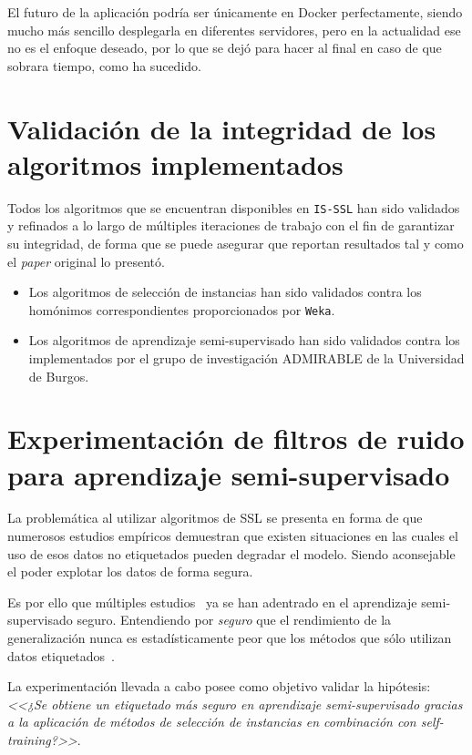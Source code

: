 El futuro de la aplicación podría ser únicamente en Docker perfectamente, siendo mucho más sencillo desplegarla en diferentes servidores, pero en la actualidad ese no es el enfoque deseado, por lo que se dejó para hacer al final en caso de que sobrara tiempo, como ha sucedido.

\section{Validación de la integridad de los algoritmos implementados}
Todos los algoritmos que se encuentran disponibles en \texttt{IS-SSL} han sido validados y refinados a lo largo de múltiples iteraciones de trabajo con el fin de garantizar su integridad, de forma que se puede asegurar que reportan resultados tal y como el \textit{paper} original lo presentó.

\begin{itemize}
\item Los algoritmos de selección de instancias han sido validados contra los homónimos correspondientes proporcionados por \texttt{Weka}.
\item Los algoritmos de aprendizaje semi-supervisado han sido validados contra los implementados por el grupo de investigación ADMIRABLE de la Universidad de Burgos.
\end{itemize}


\section{Experimentación de filtros de ruido para aprendizaje semi-supervisado}
La problemática al utilizar algoritmos de SSL se presenta en forma de que numerosos estudios empíricos demuestran que existen situaciones en las cuales el uso de esos datos no etiquetados pueden degradar el modelo. Siendo aconsejable el poder explotar los datos de forma segura.

Es por ello que múltiples estudios~\cite{zhao2021safe, guo2020safe, li2016towards} ya se han adentrado en el aprendizaje semi-supervisado seguro. Entendiendo por \emph{seguro} que el rendimiento de la generalización nunca es estadísticamente peor que los métodos que sólo utilizan datos etiquetados~\cite{li2019safe}.

La experimentación llevada a cabo posee como objetivo validar la hipótesis:\\
\emph{<<¿Se obtiene un etiquetado más seguro en aprendizaje semi-supervisado gracias a la aplicación de métodos de selección de instancias en combinación con self-training?>>}.

